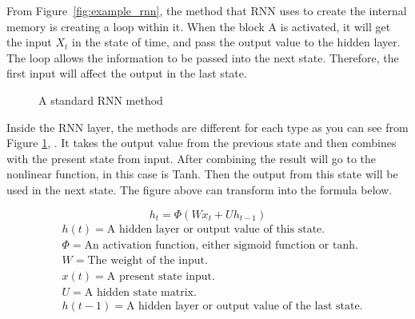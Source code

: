 \documentclass[12pt,oneside,openright,a4paper]{cpe-english-project}
\begin{document}
From Figure~\ref*{fig:example_rnn}, the method that RNN uses to create the internal memory is
creating a loop within it. When the block A is activated, it will get the input $X_t$ in the state of time,
and pass the output value to the hidden layer. The loop allows the information to be passed into the
next state. Therefore, the first input will affect the output in the last state.

\begin{figure}[!h] \centering
  \setlength{\fboxrule}{0.2mm} %
  \setlength{\fboxsep}{0.5cm} %
  \caption{A standard RNN method} %
  \label{fig:standard_rnn} %
\end{figure}

Inside the RNN layer, the methods are different for each type as you can see from Figure
\ref*{fig:standard_rnn}, . It takes the output value from the previous
state and then combines with the present state from input. After combining the result will go
to the nonlinear function, in this case is Tanh. Then the output from this state will be
used in the next state. The figure above can transform into the formula below.

\[h_t = \Phi(Wx_t + Uh_{t-1})\]
\begin{align*}
&h(t) = \text{A hidden layer or output value of this state.}\\
&\Phi = \text{An activation function, either sigmoid function or tanh.}\\
&W = \text{The weight of the input.}\\
&x(t) = \text{A present state input.}\\
&U = \text{A hidden state matrix.}\\
&h(t-1) = \text{A hidden layer or output value of the last state.}
\end{align*}
\end{document}
